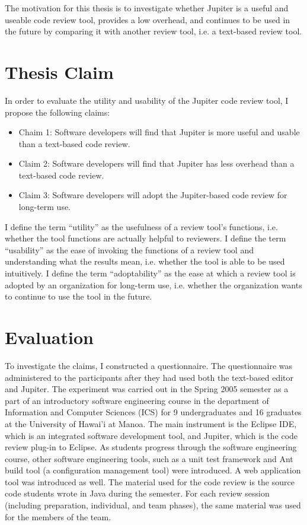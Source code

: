 The motivation for this thesis is to investigate whether Jupiter is a useful and useable code review tool, provides a low overhead, and continues to be used in the future by comparing it with another review tool, i.e. a text-based review tool.

\section{Thesis Claim}
\label{sec:thesis-claim}

In order to evaluate the utility and usability of the Jupiter code review tool, I propose the following claims:

\begin{itemize}
	\item Chaim 1: Software developers will find that Jupiter is more useful and usable than a text-based code review.
	\item Claim 2: Software developers will find that Jupiter has less overhead than a text-based code review.
	\item Claim 3: Software developers will adopt the Jupiter-based code review for long-term use.
\end{itemize}

I define the term ``utility'' as the usefulness of a review tool's functions, i.e. whether the tool functions are actually helpful to reviewers. I define the term ``usability'' as the ease of invoking the functions of a review tool and understanding what the results mean, i.e. whether the tool is able to be used intuitively. I define the term ``adoptability'' as the ease at which a review tool is adopted by an organization for long-term use, i.e. whether the organization wants to continue to use the tool in the future.

\section{Evaluation}
\label{sec:evaluation}

To investigate the claims, I constructed a questionnaire. The questionnaire was administered to the participants after they had used both the text-based editor and Jupiter. The experiment was carried out in the Spring 2005 semester as a part of an introductory software engineering course in the department of Information and Computer Sciences (ICS) for 9 undergraduates and 16 graduates at the University of Hawai'i at Manoa. The main instrument is the Eclipse IDE, which is an integrated software development tool, and Jupiter, which is the code review plug-in to Eclipse. As students progress through the software engineering course, other software engineering tools, such as a unit test framework and Ant build tool (a configuration management tool) were introduced. A web application tool was introduced as well.  The material used for the code review is the source code students wrote in Java during the semester. For each review session (including preparation, individual, and team phases), the same material was used for the members of the team.

